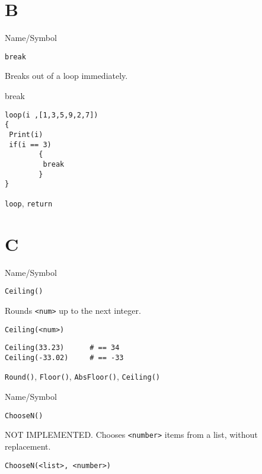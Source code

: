 \rl

\section{B}
\rl


\begin{desc}{Name/Symbol}
\item[Name/Symbol]  	\verb+break+

\item[Description]  	Breaks out of a loop immediately.

\item[Usage]        	break

\item[Example]
\begin{verbatim}
loop(i ,[1,3,5,9,2,7])
{
 Print(i)
 if(i == 3) 
        {
         break
        }
}
\end{verbatim}

\item[See Also]   	\verb+loop+, \verb+return+
\end{desc}

\rl


\section{C}
\rl


\begin{desc}{Name/Symbol}
\item[Name/Symbol]  	\verb+Ceiling()+

\item[Description] 	Rounds \verb+<num>+ up to the next integer.

\item[Usage]
\begin{verbatim}
Ceiling(<num>)
\end{verbatim}

\item[Example] 
\begin{verbatim}
Ceiling(33.23)  	# == 34
Ceiling(-33.02) 	# == -33
\end{verbatim}

\item[See Also]     	\verb+Round()+, \verb+Floor()+, \verb+AbsFloor()+, \verb+Ceiling()+
\end{desc}

\rl


\begin{desc}{Name/Symbol}
\item[Name/Symbol]  	\verb+ChooseN()+

\item[Description] 	NOT IMPLEMENTED.  Chooses \verb+<number>+ items from a list, without replacement.

\item[Usage] 
\begin{verbatim}
ChooseN(<list>, <number>)
\end{verbatim}

\item[Example]	

\item[See Also]	
\end{desc}


